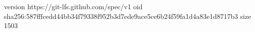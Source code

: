 version https://git-lfs.github.com/spec/v1
oid sha256:587fffcedd44bb34f79338f952b3d7ede9ace5ce6b24f59fa1d4a83e1d8717b3
size 1503
